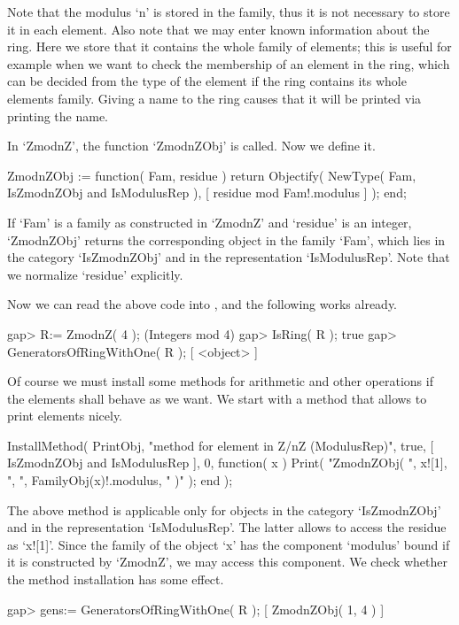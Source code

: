 Note that the modulus `n' is stored in the family,
thus it is not necessary to store it in each element.
Also note that we may enter known information about the ring.
Here we store that it contains the whole family of elements;
this is useful for example when we want to check the membership of an
element in the ring, which can be decided from the type of the element
if the ring contains its whole elements family.
Giving a name to the ring causes that it will be printed
via printing the name.

In `ZmodnZ', the function `ZmodnZObj' is called.
Now we define it.

\beginexample
    ZmodnZObj := function( Fam, residue )
        return Objectify( NewType( Fam, IsZmodnZObj and IsModulusRep ),
                          [ residue mod Fam!.modulus ] );
    end;
\endexample

If `Fam' is a family as constructed in `ZmodnZ'
and `residue' is an integer,
`ZmodnZObj' returns the corresponding object in the family `Fam',
which lies in the category `IsZmodnZObj' and in the representation
`IsModulusRep'.
Note that we normalize `residue' explicitly.

Now we can read the above code into {\GAP},
and the following works already.

\beginexample
    gap> R:= ZmodnZ( 4 );
    (Integers mod 4)
    gap> IsRing( R );
    true
    gap> GeneratorsOfRingWithOne( R );
    [ <object> ]
\endexample

Of course we must install some methods for arithmetic and other
operations if the elements shall behave as we want.
We start with a method that allows to print elements nicely.

\beginexample
    InstallMethod( PrintObj,
        "method for element in Z/nZ (ModulusRep)",
        true,
        [ IsZmodnZObj and IsModulusRep ], 0,
        function( x )
        Print( "ZmodnZObj( ", x![1], ", ", FamilyObj(x)!.modulus, " )" );
        end );
\endexample

The above method is applicable only for objects in the category
`IsZmodnZObj' and in the representation `IsModulusRep'.
The latter allows to access the residue as `x![1]'.
Since the family of the object `x' has the component `modulus' bound
if it is constructed by `ZmodnZ', we may access this component.
We check whether the method installation has some effect.

\beginexample
    gap> gens:= GeneratorsOfRingWithOne( R );
    [ ZmodnZObj( 1, 4 ) ]
\endexample

